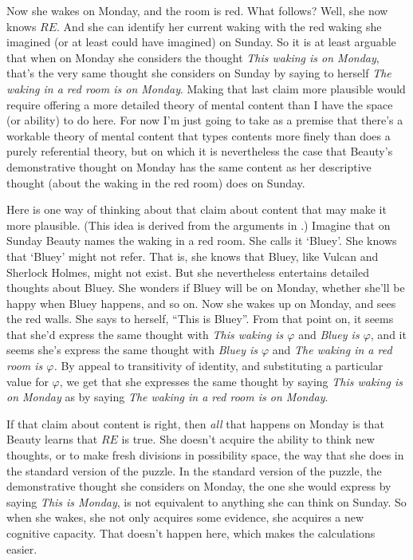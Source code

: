 Now she wakes on Monday, and the room is red. What follows? Well, she now knows $RE$. And she can identify her current waking with the red waking she imagined (or at least could have imagined) on Sunday. So it is at least arguable that when on Monday she considers the thought \textit{This waking is on Monday}, that's the very same thought she considers on Sunday by saying to herself \textit{The waking in a red room is on Monday}. Making that last claim more plausible would require offering a more detailed theory of mental content than I have the space (or ability) to do here. For now I'm just going to take as a premise that there's a workable theory of mental content that types contents more finely than does a purely referential theory, but on which it is nevertheless the case that Beauty's demonstrative thought on Monday has the same content as her descriptive thought (about the waking in the red room) does on Sunday. 

Here is one way of thinking about that claim about content that may make it more plausible. (This idea is derived from the arguments in \citet{Jeshion2002}.) Imagine that on Sunday Beauty names the waking in a red room. She calls it `Bluey'. She knows that `Bluey' might not refer. That is, she knows that Bluey, like Vulcan and Sherlock Holmes, might not exist. But she nevertheless entertains detailed thoughts about Bluey. She wonders if Bluey will be on Monday, whether she'll be happy when Bluey happens, and so on. Now she wakes up on Monday, and sees the red walls. She says to herself, ``This is Bluey''. From that point on, it seems that she'd express the same thought with \textit{This waking is $\varphi$} and \textit{Bluey is $\varphi$}, and it seems she's express the same thought with \textit{Bluey is $\varphi$} and \textit{The waking in a red room is $\varphi$.} By appeal to transitivity of identity, and substituting a particular value for $\varphi$, we get that she expresses the same thought by saying \textit{This waking is on Monday} as by saying  \textit{The waking in a red room is on Monday}.

If that claim about content is right, then \textit{all} that happens on Monday is that Beauty learns that $RE$ is true. She doesn't acquire the ability to think new thoughts, or to make fresh divisions in possibility space, the way that she does in the standard version of the puzzle. In the standard version of the puzzle, the demonstrative thought she considers on Monday, the one she would express by saying \textit{This is Monday}, is not equivalent to anything she can think on Sunday. So when she wakes, she not only acquires some evidence, she acquires a new cognitive capacity. That doesn't happen here, which makes the calculations easier.

